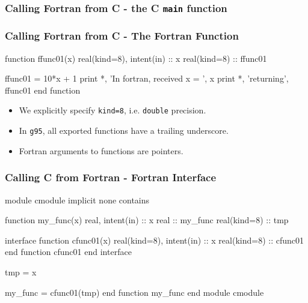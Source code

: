 \documentclass[table]{beamer}
\newif\ifschigh\schighfalse
\newcommand{\kw}[1]{\ifschigh\textcolor{red}{#1}\else\textcolor{keyword}{#1}\fi}
\newcommand{\kt}[1]{\ifschigh\textcolor{red}{#1}\else\textcolor{ctext}{#1}\fi}
\begin{document}
\begin{frame}[fragile]
\frametitle{Calling Fortran from C - the C {\tt main} function}
\end{frame}

\begin{frame}[fragile]
\frametitle{Calling Fortran from C - The Fortran Function}
\begin{semiverbatim}
\small
\kw{function} ffunc01(x)
   \kw{real}(\kw{kind}=8), \kw{intent}(\kw{in}) :: x
   \kw{real}(\kw{kind}=8)             :: ffunc01
   
   ffunc01 = 10*x + 1   
   print *, \kt{'In fortran, received x = '}, x
   print *, \kt{'returning'}, ffunc01   
\kw{end function}
\end{semiverbatim}
\begin{itemize}
\item We explicitly specify {\tt kind=8}, i.e. {\tt double} precision.
\item In {\tt g95}, all exported functions have a trailing underscore.
\item Fortran arguments to functions are pointers.
\end{itemize}
\end{frame}

\begin{frame}[fragile]
\frametitle{Calling C from Fortran - Fortran Interface}
\begin{semiverbatim}
\scriptsize
\kw{module} cmodule
   \kw{implicit none}
\kw{contains}

   \kw{function} my_func(x)
      \kw{real}, \kw{intent}(\kw{in}) :: x
      \kw{real}             :: my_func
      \kw{real}(\kw{kind}=8)     :: tmp
            
      \kw{interface}
         \kw{function} cfunc01(x)
            \kw{real}(\kw{kind}=8), \kw{intent}(\kw{in}) :: x
            \kw{real}(\kw{kind}=8)             :: cfunc01
         \kw{end function} cfunc01
      \kw{end interface}
      
      tmp = x
                  
      my_func = cfunc01(tmp)
   \kw{end function} my_func
\kw{end module} cmodule
\end{semiverbatim}
\end{frame}
\end{document}

